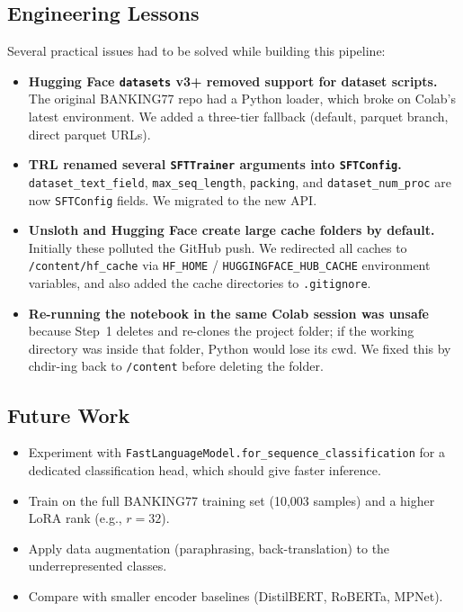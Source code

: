 \documentclass[12pt,a4paper]{article}
\begin{document}
\subsection{Engineering Lessons}

Several practical issues had to be solved while building this pipeline:
\begin{itemize}[noitemsep]
    \item \textbf{Hugging Face \texttt{datasets} v3+ removed support for
          dataset scripts.} The original BANKING77 repo had a Python loader,
          which broke on Colab's latest environment. We added a three-tier
          fallback (default, parquet branch, direct parquet URLs).
    \item \textbf{TRL renamed several \texttt{SFTTrainer} arguments into
          \texttt{SFTConfig}.} \texttt{dataset\_text\_field},
          \texttt{max\_seq\_length}, \texttt{packing}, and
          \texttt{dataset\_num\_proc} are now \texttt{SFTConfig} fields.
          We migrated to the new API.
    \item \textbf{Unsloth and Hugging Face create large cache folders by
          default.} Initially these polluted the GitHub push. We redirected
          all caches to \texttt{/content/hf\_cache} via
          \texttt{HF\_HOME} / \texttt{HUGGINGFACE\_HUB\_CACHE} environment
          variables, and also added the cache directories to
          \texttt{.gitignore}.
    \item \textbf{Re-running the notebook in the same Colab session was
          unsafe} because Step~1 deletes and re-clones the project folder;
          if the working directory was inside that folder, Python would lose
          its cwd. We fixed this by chdir-ing back to \texttt{/content} before
          deleting the folder.
\end{itemize}

\subsection{Future Work}

\begin{itemize}[noitemsep]
    \item Experiment with
          \texttt{FastLanguageModel.for\_sequence\_classification} for a
          dedicated classification head, which should give faster inference.
    \item Train on the full BANKING77 training set (10{,}003 samples) and a
          higher LoRA rank (e.g., $r=32$).
    \item Apply data augmentation (paraphrasing, back-translation) to the
          underrepresented classes.
    \item Compare with smaller encoder baselines (DistilBERT, RoBERTa, MPNet).
\end{itemize}
\end{document}
